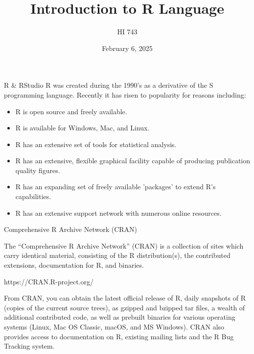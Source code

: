 \documentclass[aspectratio=169,xcolor=dvipsnames]{beamer}
\title{Introduction to R Language}
\subtitle{HI 743}
\author{}
\institute
{
    Department of Health Informatics and Administration \\
    Zilber College of Public Health \\
    University of Wisconsin - Milwaukee%
}
\date{February 6, 2025} %
\begin{document}
\begin{frame}
    \titlepage
\end{frame}

\begin{frame}{R \& RStudio}
R was created during the 1990's as a derivative of the S programming language. Recently it has risen to popularity for reasons including:
\vspace{0.5cm}
\begin{itemize}
\item R is open source and freely available.
\item R is available for Windows, Mac, and Linux.
\item R has an extensive set of tools for statistical analysis.
\item R has an extensive, flexible graphical facility capable of producing publication quality figures.
\item R has an expanding set of freely available 'packages' to extend R's capabilities.
\item R has an extensive support network with numerous online resources.

\end{itemize}
\end{frame}


\begin{frame}{Comprehensive R Archive Network (CRAN)}

The “Comprehensive R Archive Network” (CRAN) is a collection of sites which carry identical material, consisting of the R distribution(s), the contributed extensions, documentation for R, and binaries.

\begin{center}
https://CRAN.R-project.org/
\end{center}

From CRAN, you can obtain the latest official release of R, daily snapshots of R (copies of the current source trees), as gzipped and bzipped tar files, a wealth of additional contributed code, as well as prebuilt binaries for various operating systems (Linux, Mac OS Classic, macOS, and MS Windows). CRAN also provides access to documentation on R, existing mailing lists and the R Bug Tracking system.

\end{frame}
\end{document}
